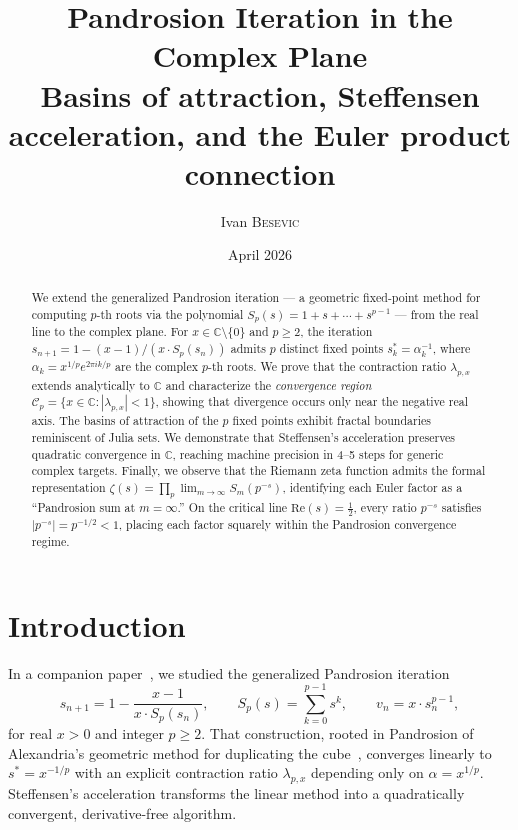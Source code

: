 \documentclass[11pt,a4paper]{article}
\title{\textbf{Pandrosion Iteration in the Complex Plane}\\[0.3em]
  \large Basins of attraction, Steffensen acceleration,
  and the Euler product connection}
\author{Ivan \textsc{Besevic}}
\date{April 2026}
\theoremstyle{definition}
\newcommand{\CC}{\mathbb{C}}
\begin{document}
\maketitle

\begin{abstract}
We extend the generalized Pandrosion iteration --- a geometric fixed-point method for computing $p$-th roots via the polynomial $S_p(s) = 1 + s + \cdots + s^{p-1}$ --- from the real line to the complex plane.  For $x \in \CC \setminus \{0\}$ and $p \geq 2$, the iteration $s_{n+1} = 1 - (x-1)/(x \cdot S_p(s_n))$ admits $p$ distinct fixed points $s_k^* = \alpha_k^{-1}$, where $\alpha_k = x^{1/p} e^{2\pi i k / p}$ are the complex $p$-th roots.  We prove that the contraction ratio $\lambda_{p,x}$ extends analytically to $\CC$ and characterize the \emph{convergence region} $\mathcal{C}_p = \{x \in \CC : |\lambda_{p,x}| < 1\}$, showing that divergence occurs only near the negative real axis.  The basins of attraction of the $p$ fixed points exhibit fractal boundaries reminiscent of Julia sets.  We demonstrate that Steffensen's acceleration preserves quadratic convergence in $\CC$, reaching machine precision in 4--5 steps for generic complex targets.  Finally, we observe that the Riemann zeta function admits the formal representation $\zeta(s) = \prod_p \lim_{m \to \infty} S_m(p^{-s})$, identifying each Euler factor as a ``Pandrosion sum at $m = \infty$.''  On the critical line $\mathrm{Re}(s) = \tfrac{1}{2}$, every ratio $p^{-s}$ satisfies $|p^{-s}| = p^{-1/2} < 1$, placing each factor squarely within the Pandrosion convergence regime.
\end{abstract}

\tableofcontents
\bigskip

\section{Introduction}

In a companion paper~\cite{besevic2026}, we studied the generalized Pandrosion iteration
\begin{equation}
  \label{eq:pandrosion_real}
  s_{n+1} = 1 - \frac{x-1}{x \cdot S_p(s_n)},
  \qquad
  S_p(s) = \sum_{k=0}^{p-1} s^k,
  \qquad
  v_n = x \cdot s_n^{p-1},
\end{equation}
for real $x > 0$ and integer $p \geq 2$.  That construction, rooted in Pandrosion of Alexandria's geometric method for duplicating the cube~\cite{pappus}, converges linearly to $s^* = x^{-1/p}$ with an explicit contraction ratio $\lambda_{p,x}$ depending only on $\alpha = x^{1/p}$.  Steffensen's acceleration transforms the linear method into a quadratically convergent, derivative-free algorithm.
\end{document}
